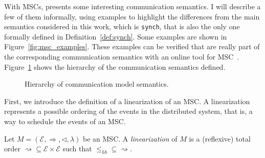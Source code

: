 With MSCs, \cite{di2023partial} presents some interesting communication
semantics. I will describe a few of them informally, using examples to
highlight the differences from the main semantics considered in this work,
which is \verb|synch|, that is also the only one formally defined in 
Definition~\ref{def:synch}. Some examples are
shown in Figure~\ref{fig:msc_examples}. These examples can be verified that 
are really part of the corresponding communication semantics with an online
tool for MSC~\cite{MSCTool}. Figure~\ref{fig:coms} shows the hierarchy
of the communication semantics defined.

\begin{figure}[!ht]
\centering
{}
\caption{Hierarchy of communication model semantics.}
\label{fig:coms}
\end{figure}

First, we introduce the definition of a linearization of an MSC. A
linearization represents a possible ordering of the events in the distributed
system, that is, a way to schedule the events of an MSC.

\begin{definition}
	Let $M = (\mathcal{E}, \Rightarrow, \triangleleft, \lambda)$ be an MSC.
	A \emph{linearization} of $M$ is a (reflexive) total order
	$\rightsquigarrow \subseteq \mathcal{E} \times \mathcal{E}$ such that
	$\leq_{hb} \subseteq \rightsquigarrow$.
\end{definition}

